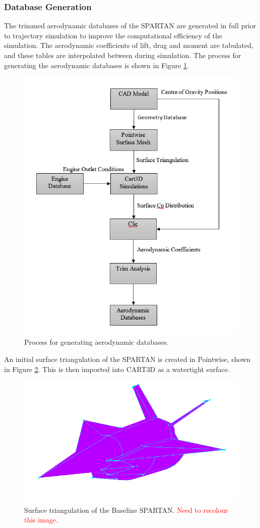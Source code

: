 		\subsubsection{Database Generation}
		The trimmed aerodynamic databases of the SPARTAN are generated in full prior to trajectory simulation to improve the computational efficiency of the simulation. The aerodynamic coefficients of lift, drag and moment are tabulated, and these tables are interpolated between during simulation. 
The process for generating the aerodynamic databases is shown in Figure \ref{fig:FlowChart}. 
				\begin{figure}[ht]
					\centering
					\includegraphics[width=0.7\linewidth]{figures/3_vehicle_design/FlowChart}
					\caption{Process for generating aerodynamic databases.}
					\label{fig:FlowChart}
				\end{figure}
		An initial surface triangulation of the SPARTAN is created in Pointwise, shown in Figure \ref{fig:Pointwise}. This is then imported into CART3D as a watertight surface. 
				\begin{figure}[ht]
					\centering
					\includegraphics[width=0.6\linewidth]{figures/3_vehicle_design/Pointwise}
					\caption{Surface triangulation of the Baseline SPARTAN. \textcolor{red}{Need to recolour this image.}}
					\label{fig:Pointwise}
				\end{figure}

